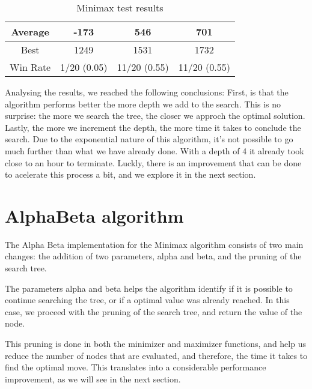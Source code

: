 \documentclass{article}
\begin{document}
\begin{table}[ht]
\begin{center}
\begin{tabular}{||c||c|c|c||}
    \hline\hline
    Average &  -173 &  546 &  701 \\
    \hline\hline
    Best & 1249 & 1531 & 1732 \\
    \hline\hline
    Win Rate & 1/20 (0.05) & 11/20 (0.55) & 11/20 (0.55) \\
    \hline
  \end{tabular}
  \caption{Minimax test results}
  \label{tab:minimax}
  \end{center}
\end{table}

Analysing the results, we reached the following conclusions: First, is that the algorithm performs better the more depth we add to the search. This is no surprise: the more we search the tree, the closer we approch the optimal solution.
Lastly, the more we increment the depth, the more time it takes to conclude the search. Due to the exponential nature of this algorithm, it's not possible to go much further than what we have already done. With a depth of 4 it already took close to an hour to terminate. Luckly, there is an improvement that can be done to acelerate this process a bit, and we explore it in the next section.

\pagebreak
\section{AlphaBeta algorithm}

The Alpha Beta implementation for the Minimax algorithm consists of two main changes: the addition of two parameters, alpha and beta, and the pruning of the search tree.

The parameters alpha and beta helps the algorithm identify if it is possible to continue searching the tree, or if a optimal value was already reached. In this case, we proceed with the pruning of the search tree, and return the value of the node.

This pruning is done in both the minimizer and maximizer functions, and help us reduce the number of nodes that are evaluated, and therefore, the time it takes to find the optimal move. This translates into a considerable performance improvement, as we will see in the next section.
\end{document}
